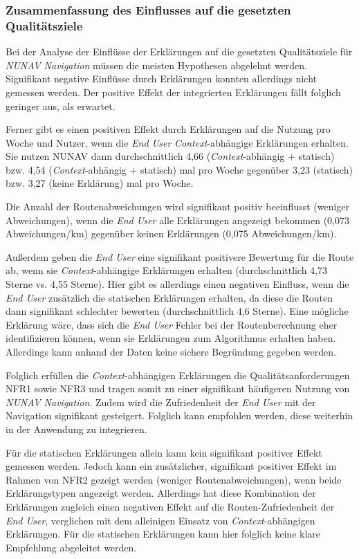\subsubsection{Zusammenfassung des Einflusses auf die gesetzten Qualitätsziele}

Bei der Analyse der Einflüsse der Erklärungen auf die gesetzten Qualitätsziele für \textit{NUNAV Navigation} müssen die meisten Hypothesen abgelehnt werden. Signifikant negative Einflüsse durch Erklärungen konnten allerdings nicht gemessen werden. Der positive Effekt der integrierten Erklärungen fällt folglich geringer aus, als erwartet. 

Ferner gibt es einen positiven Effekt durch Erklärungen auf die Nutzung pro Woche und Nutzer, wenn die \textit{End User} \textit{Context}-abhängige Erklärungen erhalten. Sie nutzen NUNAV dann durchschnittlich 4,66 (\textit{Context}-abhängig + statisch) bzw. 4,54 (\textit{Context}-abhängig + statisch) mal pro Woche gegenüber 3,23 (statisch) bzw. 3,27 (keine Erklärung) mal pro Woche.

Die Anzahl der Routenabweichungen wird signifikant positiv beeinflusst (weniger Abweichungen), wenn die \textit{End User} alle Erklärungen angezeigt bekommen (0,073 Abweichungen/km) gegenüber keinen Erklärungen (0,075 Abweichungen/km). 

Außerdem geben die \textit{End User} eine signifikant positivere Bewertung für die Route ab, wenn sie \textit{Context}-abhängige Erklärungen erhalten (durchschnittlich 4,73 Sterne vs. 4,55 Sterne). Hier gibt es allerdings einen negativen Einfluss, wenn die \textit{End User} zusätzlich die statischen Erklärungen erhalten, da diese die Routen dann signifikant schlechter bewerten (durchschnittlich 4,6 Sterne). Eine mögliche Erklärung wäre, dass sich die \textit{End User} Fehler bei der Routenberechnung eher identifizieren können, wenn sie Erklärungen zum Algorithmus erhalten haben. Allerdings kann anhand der Daten keine sichere Begründung gegeben werden.

Folglich erfüllen die \textit{Context}-abhängigen Erklärungen die Qualitätsanforderungen NFR1 sowie NFR3 und tragen somit zu einer signifikant häufigeren Nutzung von \textit{NUNAV Navigation}. Zudem wird die Zufriedenheit der \textit{End User} mit der Navigation signifikant gesteigert. Folglich kann empfohlen werden, diese weiterhin in der Anwendung zu integrieren.

Für die statischen Erklärungen allein kann kein signifikant positiver Effekt gemessen werden. Jedoch kann ein zusätzlicher, signifikant positiver Effekt im Rahmen von NFR2 gezeigt werden (weniger Routenabweichungen), wenn beide Erklärungstypen angezeigt werden. Allerdings hat diese Kombination der Erklärungen zugleich einen negativen Effekt auf die Routen-Zufriedenheit der \textit{End User}, verglichen mit dem alleinigen Einsatz von \textit{Context}-abhängigen Erklärungen. Für die statischen Erklärungen kann hier folglich keine klare Empfehlung abgeleitet werden.

\newpage